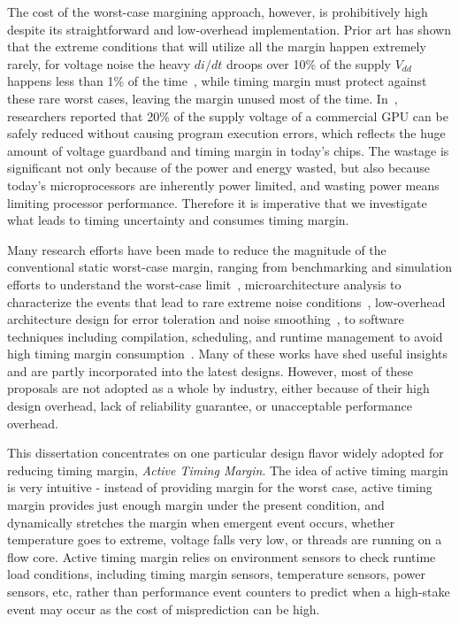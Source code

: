 The cost of the worst-case margining approach, however, is prohibitively high despite its straightforward and low-overhead implementation. Prior art has shown that the extreme conditions that will utilize all the margin happen extremely rarely, for voltage noise the heavy $di/dt$ droops over 10\% of the supply $V_{dd}$ happens less than 1\% of the time~\cite{reddi2010voltage, leng2014gpuvolt}, while timing margin must protect against these rare worst cases, leaving the margin unused most of the time. In~\cite{leng2015safe}, researchers reported that 20\% of the supply voltage of a commercial GPU can be safely reduced without causing program execution errors, which reflects the huge amount of voltage guardband and timing margin in today's chips. The wastage is significant not only because of the power and energy wasted, but also because today's microprocessors are inherently power limited, and wasting power means limiting processor performance. Therefore it is imperative that we investigate what leads to timing uncertainty and consumes timing margin.

Many research efforts have been made to reduce the magnitude of the conventional static worst-case margin, ranging from benchmarking and simulation efforts to understand the worst-case limit~\cite{kim2012audit,bertran2014voltage, sarangi2008varius}, microarchitecture analysis to characterize the events that lead to rare extreme noise conditions~\cite{powell2003pipeline, gupta2007understanding, gupta2009event, reddi2009voltage}, low-overhead architecture design for error toleration and noise smoothing~\cite{gupta2008decor,reddi2009voltage,leng2015gpu, ernst2003razor}, to software techniques including compilation, scheduling, and runtime management to avoid high timing margin consumption~\cite{reddi2010eliminating,miller2012vrsync,papadimitriou2017harnessing,leng2015safe}. Many of these works have shed useful insights and are partly incorporated into the latest designs. However, most of these proposals are not adopted as a whole by industry, either because of their high design overhead, lack of reliability guarantee, or unacceptable performance overhead.

This dissertation concentrates on one particular design flavor widely adopted for reducing timing margin, \textit{Active Timing Margin}. The idea of active timing margin is very intuitive - instead of providing margin for the worst case, active timing margin provides just enough margin under the present condition, and dynamically stretches the margin when emergent event occurs, whether temperature goes to extreme, voltage falls very low, or threads are running on a flow core. Active timing margin relies on environment sensors to check runtime load conditions, including timing margin sensors, temperature sensors, power sensors, etc, rather than performance event counters to predict when a high-stake event may occur as the cost of misprediction can be high. 

